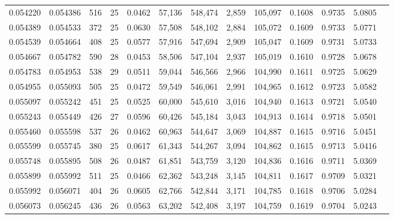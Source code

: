 \begin{tabular}{rrrrrrrrrrrrr}
0.054220 & 0.054386 & 516 &  25 &                                     0.0462 &  57,136 & 548,474 &   2,859 & 105,097 & 0.1608 & 0.9735 & 5.0805 \\
0.054389 & 0.054533 & 372 &  25 &                                     0.0630 &  57,508 & 548,102 &   2,884 & 105,072 & 0.1609 & 0.9733 & 5.0771 \\
0.054539 & 0.054664 & 408 &  25 &                                     0.0577 &  57,916 & 547,694 &   2,909 & 105,047 & 0.1609 & 0.9731 & 5.0733 \\
0.054667 & 0.054782 & 590 &  28 &                                     0.0453 &  58,506 & 547,104 &   2,937 & 105,019 & 0.1610 & 0.9728 & 5.0678 \\
0.054783 & 0.054953 & 538 &  29 &                                     0.0511 &  59,044 & 546,566 &   2,966 & 104,990 & 0.1611 & 0.9725 & 5.0629 \\
0.054955 & 0.055093 & 505 &  25 &                                     0.0472 &  59,549 & 546,061 &   2,991 & 104,965 & 0.1612 & 0.9723 & 5.0582 \\
0.055097 & 0.055242 & 451 &  25 &                                     0.0525 &  60,000 & 545,610 &   3,016 & 104,940 & 0.1613 & 0.9721 & 5.0540 \\
0.055243 & 0.055449 & 426 &  27 &                                     0.0596 &  60,426 & 545,184 &   3,043 & 104,913 & 0.1614 & 0.9718 & 5.0501 \\
0.055460 & 0.055598 & 537 &  26 &                                     0.0462 &  60,963 & 544,647 &   3,069 & 104,887 & 0.1615 & 0.9716 & 5.0451 \\
0.055599 & 0.055745 & 380 &  25 &                                     0.0617 &  61,343 & 544,267 &   3,094 & 104,862 & 0.1615 & 0.9713 & 5.0416 \\
0.055748 & 0.055895 & 508 &  26 &                                     0.0487 &  61,851 & 543,759 &   3,120 & 104,836 & 0.1616 & 0.9711 & 5.0369 \\
0.055899 & 0.055992 & 511 &  25 &                                     0.0466 &  62,362 & 543,248 &   3,145 & 104,811 & 0.1617 & 0.9709 & 5.0321 \\
0.055992 & 0.056071 & 404 &  26 &                                     0.0605 &  62,766 & 542,844 &   3,171 & 104,785 & 0.1618 & 0.9706 & 5.0284 \\
0.056073 & 0.056245 & 436 &  26 &                                     0.0563 &  63,202 & 542,408 &   3,197 & 104,759 & 0.1619 & 0.9704 & 5.0243 \\

\end{tabular}
